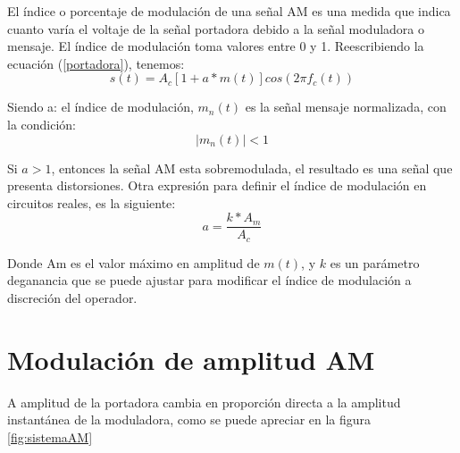 \documentclass{article}
\begin{document}
El índice o porcentaje de modulación de una señal AM es una medida que indica cuanto varía el voltaje de la señal portadora debido a la señal moduladora o mensaje. El índice de modulación toma valores entre 0 y 1. Reescribiendo la ecuación (\ref{portadora}), tenemos:\citep{IndiceModulacion}\\


    \begin{equation}
    s(t)=A_c[1+a*m(t)]cos(2 \pi f_c(t))
    \label{portadoraPorA}
\end{equation}

Siendo a: el índice de modulación, $m_n(t)$ es la señal mensaje normalizada, con la condición:\citep{IndiceModulacion}\\

\begin{equation}
    |m_n(t)|<1
\end{equation}

Si $a > 1$, entonces la señal AM esta sobremodulada, el resultado es una señal que presenta distorsiones. Otra expresión para definir el índice de modulación en circuitos reales, es la siguiente:\citep{IndiceModulacion}\\

\begin{equation}
    a=\frac{k*A_m}{A_c}
\end{equation}

Donde Am es el valor máximo en amplitud de $m(t)$, y $k$ es un parámetro deganancia que se puede ajustar para modificar el índice de modulación a discreción del operador.\citep{IndiceModulacion}\\

 \section{Modulación de amplitud AM}
 
 A amplitud de la portadora cambia en proporción directa a la amplitud instantánea de la moduladora, como se puede apreciar en la figura \ref{fig:sistemaAM}
\end{document}
